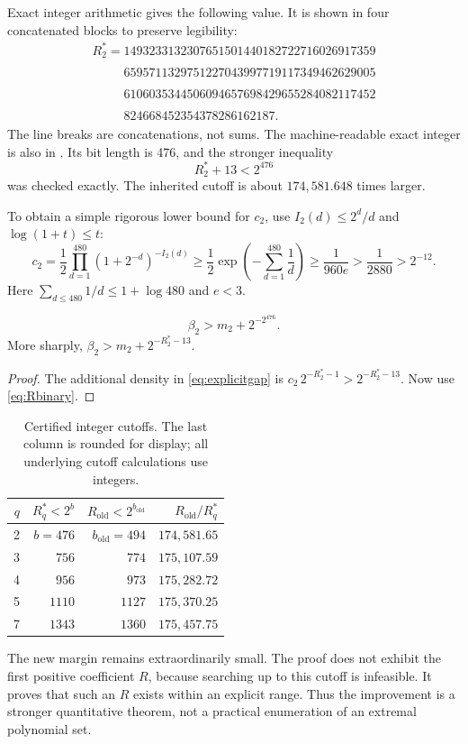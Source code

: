 Exact integer arithmetic gives the following value. It is shown in four
concatenated blocks to preserve legibility:
\[
\begin{array}{l}
R_2^*={}1493233132307651501440182722716026917359\\[-2pt]
\phantom{R_2^*={}}6595711329751227043997719117349462629005\\[-2pt]
\phantom{R_2^*={}}6106035344506094657698429655284082117452\\[-2pt]
\phantom{R_2^*={}}824668452354378286162187 .
\end{array}
\]
The line breaks are concatenations, not sums. The machine-readable exact
integer is also in .
Its bit length is 476, and the stronger inequality
\begin{equation}\label{eq:Rbinary}
 R_2^*+13<2^{476}
\end{equation}
was checked exactly. The inherited cutoff is about \(174{,}581.648\)
times larger.

To obtain a simple rigorous lower bound for \(c_2\), use
\(I_2(d)\le2^d/d\) and \(\log(1+t)\le t\):
\[
 c_2=\frac12\prod_{d=1}^{480}(1+2^{-d})^{-I_2(d)}
 \ge\frac12\exp\left(-\sum_{d=1}^{480}\frac1d\right)
 \ge\frac1{960e}>\frac1{2880}>2^{-12}.
\]
Here \(\sum_{d\le480}1/d\le1+\log480\) and \(e<3\).

\begin{corollary}\label{cor:binary}
\[
 \boxed{\displaystyle \beta_2>m_2+2^{-2^{476}}.}
\]
More sharply, \(\beta_2>m_2+2^{-R_2^*-13}\).
\end{corollary}

\begin{proof}
The additional density in \eqref{eq:explicitgap} is
\(c_2\,2^{-R_2^*-1}>2^{-R_2^*-13}\).
Now use \eqref{eq:Rbinary}.
\end{proof}

\begin{table}[htbp]
\centering
\begin{tabular}{@{}rrrr@{}}
\toprule
\(q\) & \(R_q^*<2^b\) & \(R_{\mathrm{old}}<2^{b_{\mathrm{old}}}\)
 & \(R_{\mathrm{old}}/R_q^*\)\\
\midrule
2 & \(b=476\) & \(b_{\mathrm{old}}=494\) & \(174{,}581.65\)\\
3 & \(756\) & \(774\) & \(175{,}107.59\)\\
4 & \(956\) & \(973\) & \(175{,}282.72\)\\
5 & \(1110\) & \(1127\) & \(175{,}370.25\)\\
7 & \(1343\) & \(1360\) & \(175{,}457.75\)\\
\bottomrule
\end{tabular}
\caption{Certified integer cutoffs. The last column is rounded for display;
all underlying cutoff calculations use integers.}
\end{table}

The new margin remains extraordinarily small. The proof does not exhibit
the first positive coefficient \(R\), because searching up to this cutoff
is infeasible. It proves that such an \(R\) exists within an explicit range.
Thus the improvement is a stronger quantitative theorem, not a practical
enumeration of an extremal polynomial set.
